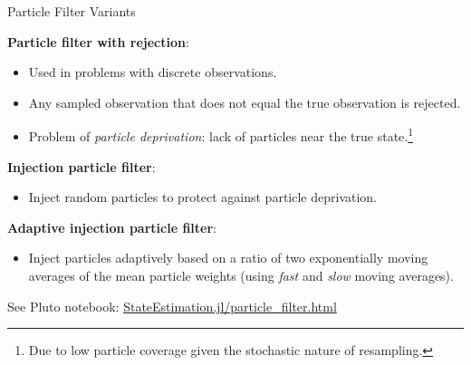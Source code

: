 \begin{frame}[fragile]{Particle Filter Variants}

\textbf{Particle filter with rejection}:
\begin{itemize}
    \item Used in problems with discrete observations.
    \item Any sampled observation that does not equal the true observation is rejected.
    \item Problem of \textit{particle deprivation}: lack of particles near the true state.\footnote{Due to low particle coverage given the stochastic nature of resampling.}
\end{itemize}

\vspace{5mm}
\textbf{Injection particle filter}:
\begin{itemize}
    \item Inject random particles to protect against particle deprivation.
\end{itemize}

\vspace{5mm}
\textbf{Adaptive injection particle filter}:
\begin{itemize}
    \item Inject particles adaptively based on a ratio of two exponentially moving averages of the mean particle weights (using \textit{fast} and \textit{slow} moving averages).
\end{itemize}

\vspace{2mm}
See Pluto notebook: \href{http://htmlview.glitch.me/?https://raw.githubusercontent.com/mossr/StateEstimation.jl/master/html/particle_filter.html}{\color{cardinal}StateEstimation.jl/particle\_filter.html}

\end{frame}